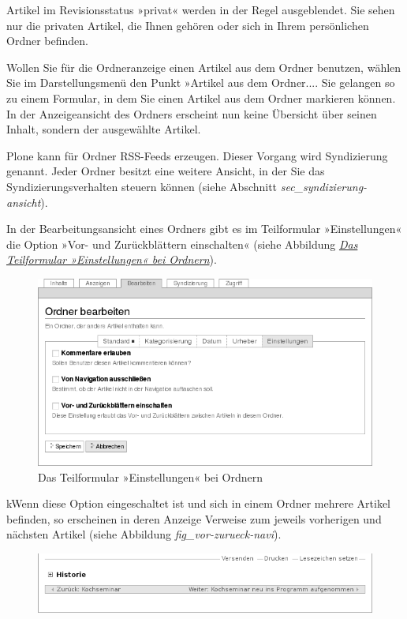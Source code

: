 \documentclass[a4paper,12pt,ngerman]{manual}
\begin{document}
Artikel im Revisionsstatus »privat« werden in der Regel ausgeblendet. Sie
sehen nur die privaten Artikel, die Ihnen gehören oder sich in Ihrem
persönlichen Ordner befinden.

Wollen Sie für die Ordneranzeige einen Artikel aus dem Ordner benutzen, wählen
Sie im Darstellungsmenü den Punkt »Artikel aus dem Ordner.... Sie
gelangen so zu einem Formular, in dem Sie einen Artikel aus dem Ordner
markieren können. In der Anzeigeansicht des Ordners erscheint nun keine
Übersicht über seinen Inhalt, sondern der ausgewählte Artikel.

Plone kann für Ordner RSS-Feeds erzeugen. Dieser Vorgang wird Syndizierung
genannt. Jeder Ordner besitzt eine weitere Ansicht, in der Sie das
Syndizierungsverhalten steuern können (siehe
Abschnitt \emph{sec\_syndizierung-ansicht}).

In der Bearbeitungsansicht eines Ordners gibt es im Teilformular
»Einstellungen« die Option »Vor- und Zurückblättern einschalten«
(siehe Abbildung \hyperlink{fig-ordner-bearbeiten}{\emph{Das Teilformular »Einstellungen« bei Ordnern}}).
\hypertarget{fig-ordner-bearbeiten}{}\begin{figure}[htbp]
\centering

\includegraphics{ordner-bearbeiten.png}
\caption{Das Teilformular »Einstellungen« bei Ordnern}\end{figure}

kWenn diese Option eingeschaltet ist und sich in einem Ordner mehrere Artikel
befinden, so erscheinen in deren Anzeige Verweise zum jeweils
vorherigen und nächsten Artikel (siehe Abbildung \emph{fig\_vor-zurueck-navi}).
\hypertarget{fig-vor-zurueck-navi}{}\begin{figure}[htbp]
\centering

\includegraphics{vor-zurueck-navi.png}
\end{figure}
\end{document}
